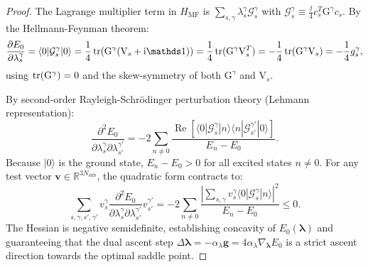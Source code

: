 \begin{proof}
The Lagrange multiplier term in $H_{\mathrm{MF}}$ is $\sum_{s,\gamma} \lambda_s^\gamma \mathcal{G}_s^\gamma$ with $\mathcal{G}_s^\gamma \equiv \frac{\ii}{4} c_s^T \mathrm{G}^\gamma c_s$. By the Hellmann-Feynman theorem:
\begin{equation}
\frac{\partial E_0}{\partial \lambda_s^\gamma} = \langle 0 | \mathcal{G}_s^\gamma | 0 \rangle = \frac{1}{4} \tr(\mathrm{G}^\gamma (\mathrm{V}_s + \ii \Id)) = \frac{1}{4} \tr(\mathrm{G}^\gamma \mathrm{V}_s^T) = -\frac{1}{4} \tr(\mathrm{G}^\gamma \mathrm{V}_s) = -\frac{1}{4} g_s^\gamma,
\end{equation}
using $\operatorname{tr}(\mathrm{G}^\gamma) = 0$ and the skew-symmetry of both $\mathrm{G}^\gamma$ and $\mathrm{V}_s$.

By second-order Rayleigh-Schr{\"o}dinger perturbation theory (Lehmann representation):
\begin{equation}
\frac{\partial^2 E_0}{\partial \lambda_s^\gamma \partial \lambda_{s'}^{\gamma'}} = -2 \sum_{n \ne 0} \frac{\operatorname{Re}\left[ \langle 0 | \mathcal{G}_s^\gamma | n \rangle \langle n | \mathcal{G}_{s'}^{\gamma'} | 0 \rangle \right]}{E_n - E_0}.
\end{equation}
Because $|0\rangle$ is the ground state, $E_n - E_0 > 0$ for all excited states $n \ne 0$. For any test vector $\mathbf{v} \in \mathbb{R}^{3N_{\mathrm{sub}}}$, the quadratic form contracts to:
\begin{equation}
\sum_{s, \gamma, s', \gamma'} v_s^\gamma \frac{\partial^2 E_0}{\partial \lambda_s^\gamma \partial \lambda_{s'}^{\gamma'}} v_{s'}^{\gamma'} = -2 \sum_{n \ne 0} \frac{\left| \sum_{s, \gamma} v_s^\gamma \langle 0 | \mathcal{G}_s^\gamma | n \rangle \right|^2}{E_n - E_0} \le 0.
\end{equation}
The Hessian is negative semidefinite, establishing concavity of $E_0(\boldsymbol{\lambda})$ and guaranteeing that the dual ascent step $\Delta \boldsymbol{\lambda} = -\alpha_\lambda \mathbf{g} = 4\alpha_\lambda \nabla_{\boldsymbol{\lambda}} E_0$ is a strict ascent direction towards the optimal saddle point.
\end{proof}

